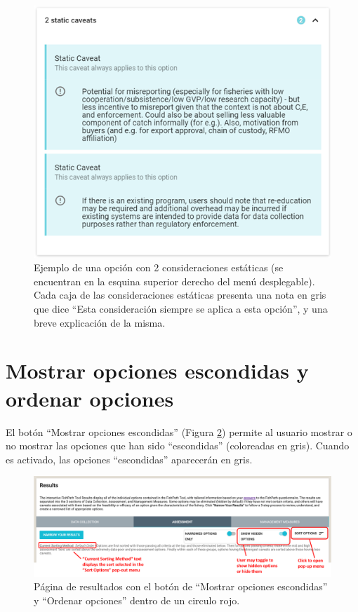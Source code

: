 \documentclass[
  11pt,
]{book}
\begin{document}
\begin{figure}

{\centering \includegraphics[width=0.75\linewidth]{images/static-cav-drop-down-es} 

}

\caption{Ejemplo de una opción con 2 consideraciones estáticas (se encuentran en la esquina superior derecho del menú desplegable). Cada caja de las consideraciones estáticas presenta una nota en gris que dice “Esta consideración siempre se aplica a esta opción”, y una breve explicación de la misma.}\label{fig:static-cav-drop-down}
\end{figure}

\hypertarget{Filters-Sorting}{%
\section{Mostrar opciones escondidas y ordenar opciones}\label{Filters-Sorting}}

El botón ``Mostrar opciones escondidas'' (Figura \ref{fig:show-hidden-sort}) permite al usuario mostrar o no mostrar las opciones que han sido ``escondidas'' (coloreadas en gris). Cuando es activado, las opciones ``escondidas'' aparecerán en gris.

\begin{figure}

{\centering \includegraphics[width=0.75\linewidth]{images/show-hidden-options-and-sort} 

}

\caption{Página de resultados con el botón de “Mostrar opciones escondidas” y “Ordenar opciones” dentro de un circulo rojo.}\label{fig:show-hidden-sort}
\end{figure}
\end{document}
